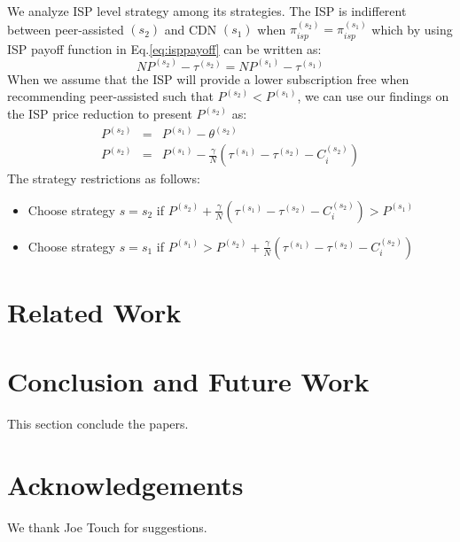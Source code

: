 \documentclass[paper]{ieice}
\begin{document}
We analyze ISP level strategy among its strategies.
The ISP is indifferent between peer-assisted $(s_2)$ and CDN $(s_1)$ when $\pi^{(s_2)}_{isp} = \pi^{(s_1)}_{isp}$
which by using ISP payoff function in Eq.\ref{eq:isppayoff} can be written as: 
\begin{equation}
	N P^{(s_2)} - \tau^{(s_2)} = N P^{(s_1)} - \tau^{(s_1)}
\end{equation}
When we assume that the ISP will provide a lower subscription free when recommending peer-assisted such that $P^{(s_2)} < P^{(s_1)}$, we can use our findings on the ISP price reduction to present $P^{(s_2)}$ as:
\begin{eqnarray}
	\nonumber P^{(s_2)} &=& P^{(s_1)} - \theta^{(s_2)} \\
	P^{(s_2)} &=& P^{(s_1)} - \frac{\gamma}{N} (\tau^{(s_1)} - \tau^{(s_2)} - C^{(s_2)}_i )
\end{eqnarray}
The strategy restrictions as follows:
\begin{itemize}
	\item Choose strategy $s=s_2$ if $ P^{(s_2)} + \frac{\gamma}{N} (\tau^{(s_1)} - \tau^{(s_2)} - C^{(s_2)}_i ) > P^{(s_1)}$
	\item Choose strategy $s=s_1$ if $ P^{(s_1)} > P^{(s_2)} + \frac{\gamma}{N} (\tau^{(s_1)} - \tau^{(s_2)} - C^{(s_2)}_i )$ 
\end{itemize}



\section{Related Work} 



\section{Conclusion and Future Work}\label{conclude}
This section conclude the papers. 





\section*{Acknowledgements}
We thank Joe Touch for suggestions.


\end{document}
